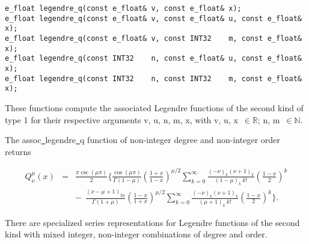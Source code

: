 \begin{lstlisting}
e_float legendre_q(const e_float& v, const e_float& x);
e_float legendre_q(const e_float& v, const e_float& u, const e_float& x);
e_float legendre_q(const e_float& v, const INT32    m, const e_float& x);
e_float legendre_q(const INT32    n, const e_float& u, const e_float& x);
e_float legendre_q(const INT32    n, const INT32    m, const e_float& x);
\end{lstlisting}

\vspace{6.0pt}

 These functions compute the associated Legendre functions
of the second kind of type 1 for their respective arguments {\courier v}, {\courier u},
{\courier n}, {\courier m}, {\courier x},
with {\courier v}, {\courier u}, {\courier x}~$\in\mathbb{R}$;
{\courier n}, {\courier m}~$\in\mathbb{N}$.

\vspace{6.0pt}

 The {\courier assoc\underline\ legendre\underline\ q} function
of non-integer degree and non-integer order
returns~\cite{wolframfunctions:website}

\begin{eqnarray}
Q_{\nu}^{\mu}(x) & = & 
\frac{\pi\csc(\mu\pi)}{2}
\Biggl\{
\frac{\cos(\mu\pi)}{\Gamma(1-\mu)}
\left(\frac{1+x}{1-x}\right)^{\mu/2}
\sum_{k=0}^{\infty}
\frac{(-\nu)_{k}(\nu+1)_{k}}{(1 - \mu)_{k} \ k!}
\left(\frac{1-x}{2}\right)^k
\nonumber\\
& & - \ \ 
\frac{(\nu-\mu+1)_{2\mu}}{\Gamma(1+\mu)}
\left(\frac{1-x}{1+x}\right)^{\mu/2}
\sum_{k=0}^{\infty}
\frac{(-\nu)_{k}(\nu+1)_{k}}{(\mu+1)_{k} \ k!}
\left(\frac{1-x}{2}\right)^k
\Biggr\}.
\end{eqnarray}

\vspace{6.0pt}

 There are specialized series representations for Legendre
functions of the second kind with mixed integer, non-integer combinations of
degree and order.

